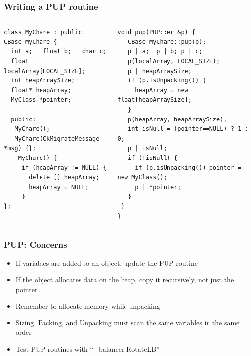 \begin{frame}[fragile]
\frametitle{Writing a PUP routine}
 \begin{columns}
 \begin{column}{0.5\textwidth}
   \begin{lstlisting}
class MyChare : public CBase_MyChare {
  int a;   float b;   char c;
  float localArray[LOCAL_SIZE];
  int heapArraySize;
  float* heapArray;
  MyClass *pointer;
 
  public:
   MyChare();
   MyChare(CkMigrateMessage *msg) {};
   ~MyChare() {
     if (heapArray != NULL) {
       delete [] heapArray;
       heapArray = NULL;
     }
};
 \end{lstlisting}
 \end{column}
 \begin{column}{0.5\textwidth}
  \begin{lstlisting}
void pup(PUP::er &p) {
   CBase_MyChare::pup(p);
   p | a;  p | b; p | c;
   p(localArray, LOCAL_SIZE);
   p | heapArraySize;
   if (p.isUnpacking()) {
     heapArray = new float[heapArraySize];
   }
   p(heapArray, heapArraySize);
   int isNull = (pointer==NULL) ? 1 : 0;
   p | isNull;
   if (!isNull) {
     if (p.isUnpacking()) pointer = new MyClass();
     p | *pointer;
   }
 }
}
  \end{lstlisting}
  \end{column}
  \end{columns}
\end{frame}

\begin{frame}[fragile]
\frametitle{PUP: Concerns}
\begin{itemize}
\item If variables are added to an object, update the PUP routine
\item If the object allocates data on the heap, copy it recursively, not just the pointer
\item Remember to allocate memory while unpacking
\item Sizing, Packing, and Unpacking must scan the same variables in the same order
\item Test PUP routines with “+balancer RotateLB”
\end{itemize}
\end{frame}


